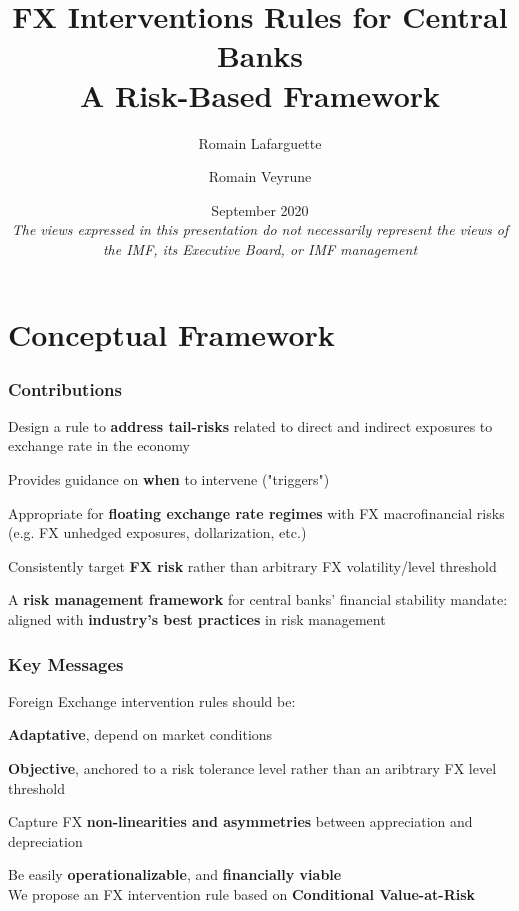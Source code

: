 \documentclass{beamer}
\title[]{FX Interventions Rules for Central Banks\\
A Risk-Based Framework}
\author[]{Romain Lafarguette \and Romain Veyrune}
\institute[]{IMF Monetary and Capital Markets Department \\ Central Bank Operations Division}
\date[]{\scriptsize September 2020 \\ \vspace{0.5cm} \scriptsize{\textit{The views
      expressed in this presentation do not necessarily represent the views of
      the IMF, its Executive Board, or IMF management} \vspace{-0.5cm}}}
\newenvironment{largeitemize}{\itemize\addtolength{\itemsep}{10pt}}{\enditemize}
\begin{document}
\begingroup
\renewcommand{\insertframenumber}{}
\begin{frame}
\maketitle
\end{frame}
\endgroup


\section{Conceptual Framework}

\begin{frame}
  \frametitle{Contributions}
  \begin{largeitemize}
    \item Design a  rule to \textbf{address tail-risks} related  to direct and indirect
exposures to exchange rate in the economy
    \item Provides guidance on \textbf{when} to intervene ("triggers")
    \item Appropriate for \textbf{floating exchange rate regimes} with FX
      macrofinancial risks (e.g. FX unhedged exposures,
      dollarization, etc.)
    \item Consistently target \textbf{FX risk} rather than arbitrary FX volatility/level threshold
    \item A \textbf{risk management framework} for central banks' financial
      stability mandate: aligned with \textbf{industry's best practices} in risk management
  \end{largeitemize}  
\end{frame}

\begin{frame}
  \frametitle{Key Messages}
  Foreign Exchange intervention rules should be:\\
  \medskip  
  \begin{largeitemize}
  \item \textbf{Adaptative}, depend on market conditions
  \item \textbf{Objective}, anchored to a risk tolerance level
    rather than an aribtrary FX level threshold
  \item Capture FX \textbf{non-linearities and asymmetries} between appreciation and
    depreciation
  \item Be easily \textbf{operationalizable}, and \textbf{financially viable}\\
  \end{largeitemize}
\medskip  
We propose an FX intervention rule based on \textbf{Conditional Value-at-Risk}  
\end{frame}
\end{document}

